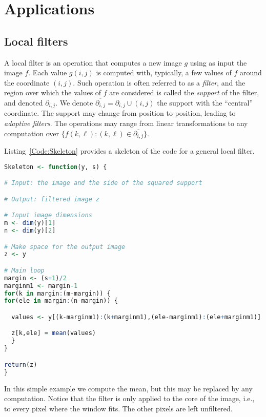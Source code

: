 \chapter{Applications}\label{Chapter:Applications}

\section{Local filters}

A local filter is an operation that computes a new image $g$ using as input the image $f$.
Each value $g(i,j)$ is computed with, typically, a few values of $f$ around the coordinate $(i,j)$.
Such operation is often referred to as a \textit{filter}, and the region over which the values of $f$ are considered is called the \textit{support} of the filter, and denoted $\partial_{i,j}$.
We denote $\overline{\partial_{i,j}}=\partial_{i,j}\cup(i,j)$ the support with the ``central'' coordinate.
The support may change from position to position, leading to \textit{adaptive filters}.
The operations may range from linear transformations to any computation over $\{f(k,\ell)\colon (k,\ell)\in\overline{\partial_{i,j}}\}$.

Listing~\ref{Code:Skeleton} provides a skeleton of the code for a general local filter.

\begin{lstlisting}[language=R,label=Code:Skeleton,frame=top,caption={Skeleton for local filters}]
Skeleton <- function(y, s) {

# Input: the image and the side of the squared support

# Output: filtered image z

# Input image dimensions
m <- dim(y)[1]
n <- dim(y)[2]

# Make space for the output image
z <- y

# Main loop
margin <- (s+1)/2
marginm1 <- margin-1
for(k in margin:(m-margin)) {
for(ele in margin:(n-margin)) {

  values <- y[(k-marginm1):(k+marginm1),(ele-marginm1):(ele+marginm1)]

  z[k,ele] = mean(values)
  }
}

return(z)
}
\end{lstlisting}

In this simple example we compute the mean, but this may be replaced by any computation.
Notice that the filter is only applied to the core of the image, i.e., to every pixel where the window fits.
The other pixels are left unfiltered.

